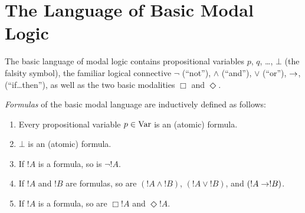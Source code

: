 \documentclass[modal-logic]{subfiles}
\begin{document}
\section{The Language of Basic Modal Logic}

The basic language of modal logic contains propositional variables
$p$, $q$, \dots, $\bot$ (the falsity symbol), the familiar logical connective $\lnot$ (``not''),
$\land$ (``and''), $\lor$ (``or''), $\to$, (``if\dots then''), as
well as the two basic modalities $\Box$ and $\Diamond$.  

\begin{defn}
\emph{Formulas} of the basic modal language are inductively defined as follows:
\begin{enumerate}
\item Every propositional variable $p \in \mathrm{Var}$ is an (atomic) formula.
\item $\bot$ is an (atomic) formula.
\item If $!A$ is a formula, so is $\lnot !A$.
\item If $!A$ and $!B$ are formulas, so are $(!A \land !B)$, $(!A \lor !B)$, and $(!A \to !B)$.
\item If $!A$ is a formula, so are $\Box !A$ and $\Diamond !A$.
\end{enumerate}
\end{defn}

\end{document}

